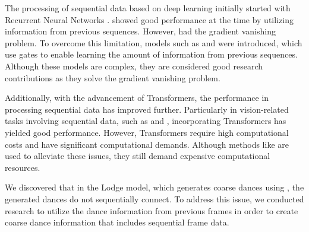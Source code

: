 The processing of sequential data based on deep learning initially started with Recurrent Neural Networks \cite{schmidt2019recurrent}. \cite{schmidt2019recurrent} showed good performance at the time by utilizing information from previous sequences. However, \cite{schmidt2019recurrent} had the gradient vanishing problem. To overcome this limitation, models such as \cite{sak2014long} and \cite{dey2017gate} were introduced, which use gates to enable learning the amount of information from previous sequences. Although these models are complex, they are considered good research contributions as they solve the gradient vanishing problem.

Additionally, with the advancement of Transformers, the performance in processing sequential data has improved further. Particularly in vision-related tasks involving sequential data, such as \cite{ge2022long, yan2021videogpt, yu2023magvit, hong2022cogvideo, ma2024latte} and \cite{arnab2021vivit, liu2022video, fan2021multiscale,li2022mvitv2}, incorporating Transformers has yielded good performance. However, Transformers require high computational costs and have significant computational demands. Although methods like \cite{ahmad2021fpn, lee2023afi} are used to alleviate these issues, they still demand expensive computational resources.

We discovered that in the Lodge model, which generates coarse dances using \cite{ho2020denoising, song2020denoising}, the generated dances do not sequentially connect. To address this issue, we conducted research to utilize the dance information from previous frames in order to create coarse dance information that includes sequential frame data.

%